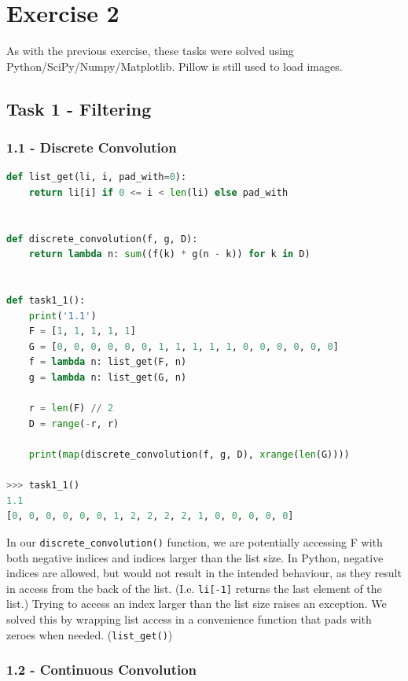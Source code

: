 \chapter{Exercise 2}

As with the previous exercise, these tasks were solved using Python/SciPy/Numpy/Matplotlib.
Pillow is still used to load images.

\section*{Task 1 - Filtering}

\subsection*{1.1 - Discrete Convolution}

\begin{lstlisting}[language=Python, label=discrete_convolution, caption=Discrete convolution - box filter]
def list_get(li, i, pad_with=0):
    return li[i] if 0 <= i < len(li) else pad_with


def discrete_convolution(f, g, D):
    return lambda n: sum((f(k) * g(n - k)) for k in D)


def task1_1():
    print('1.1')
    F = [1, 1, 1, 1, 1]
    G = [0, 0, 0, 0, 0, 0, 1, 1, 1, 1, 1, 0, 0, 0, 0, 0, 0]
    f = lambda n: list_get(F, n)
    g = lambda n: list_get(G, n)

    r = len(F) // 2
    D = range(-r, r)

    print(map(discrete_convolution(f, g, D), xrange(len(G))))

>>> task1_1()
1.1
[0, 0, 0, 0, 0, 0, 1, 2, 2, 2, 2, 1, 0, 0, 0, 0, 0]
\end{lstlisting}

In our \texttt{discrete\_convolution()} function, we are potentially accessing F with both negative indices and indices larger than the list size.
In Python, negative indices are allowed, but would not result in the intended behaviour, as they result in access from the back of the list. (I.e. \texttt{li[-1]} returns the last element of the list.)
Trying to access an index larger than the list size raises an exception.
We solved this by wrapping list access in a convenience function that pads with zeroes when needed. (\texttt{list\_get()})

\newpage
\subsection*{1.2 - Continuous Convolution}

